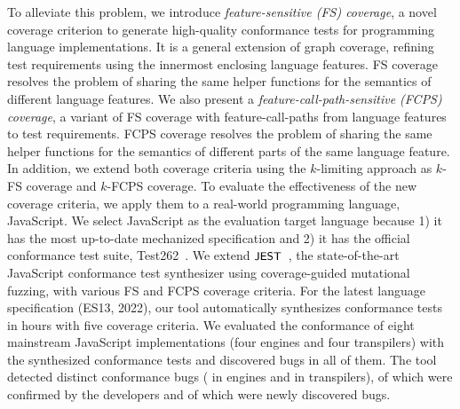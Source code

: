 To alleviate this problem, we introduce \textit{feature-sensitive (FS) coverage},
a novel coverage criterion to generate high-quality conformance tests for
programming language implementations. It is a general extension of graph coverage,
refining test requirements using the innermost enclosing language features.
FS coverage resolves the problem of sharing the same helper functions
for the semantics of different language features.
We also present a \textit{feature-call-path-sensitive (FCPS) coverage},
a variant of FS coverage with feature-call-paths from language features to test requirements.
FCPS coverage resolves the problem of sharing the same helper functions
for the semantics of different parts of the same language feature.
In addition, we extend both coverage criteria using the $k$-limiting approach as $k$-FS
coverage and $k$-FCPS coverage.
To evaluate the effectiveness of the new coverage criteria,
we apply them to a real-world programming language, JavaScript.
We select JavaScript as the evaluation target language because
1) it has the most up-to-date mechanized specification and
2) it has the official conformance test suite, Test262~\cite{test262}.
We extend $\textsf{\small JEST}$~\cite{jest}, the state-of-the-art JavaScript conformance test
synthesizer using coverage-guided mutational fuzzing, with various FS
and FCPS coverage criteria.
For the latest language specification (ES13, 2022), our tool automatically
synthesizes  conformance tests in  hours with five coverage criteria.
We evaluated the conformance of eight mainstream JavaScript implementations
(four engines and four transpilers) with the synthesized conformance tests
and discovered bugs in all of them.
The tool detected  distinct conformance bugs ( in engines
and  in transpilers),  of which were confirmed by
the developers and  of which were newly discovered bugs.


